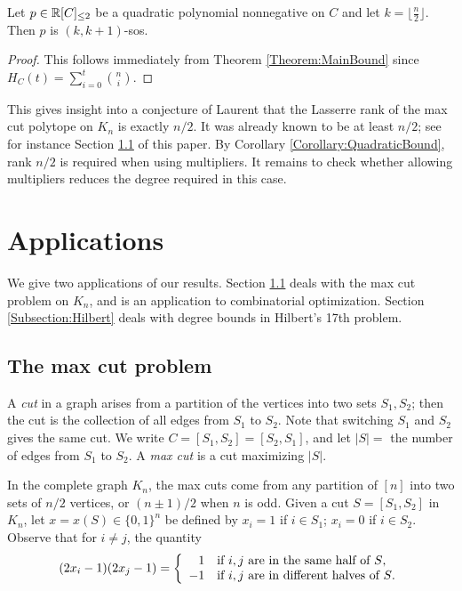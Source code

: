 \begin{corollary}\label{Corollary:QuadraticBound}
Let $p\in \mathbb{R}[C]_{\leq 2}$ be a quadratic polynomial nonnegative on $C$ and let $k=\lfloor \frac{n}{2}\rfloor$. Then $p$ is $(k,k+1)$-sos.
\end{corollary}
\begin{proof}
This follows immediately from Theorem \ref{Theorem:MainBound} since $H_C(t)=\sum_{i=0}^t \binom{n}{i}$.
\end{proof}
This gives insight into a conjecture of Laurent \cite{moniquestuff} that the Lasserre rank of the max cut polytope on $K_n$ is exactly $n/2$.
It was already known to be at least $n/2$; see for instance Section \ref{Subsection:MaxCut} of this paper. 
By Corollary \ref{Corollary:QuadraticBound}, rank $n/2$ is required when using multipliers.
It remains to check whether allowing multipliers reduces the degree required in this case.




\section{Applications}\label{Section:Applications}
We give two applications of our results. Section \ref{Subsection:MaxCut} deals with the max cut problem on $K_n$, and is an application to combinatorial optimization. Section \ref{Subsection:Hilbert} deals with degree bounds in Hilbert's 17th problem.

\subsection{The max cut problem}\label{Subsection:MaxCut}
A {\em cut} in a graph arises from a partition of the vertices into two sets $S_1,S_2$; then the cut is the collection of all edges from $S_1$ to $S_2$. Note that switching $S_1$ and $S_2$ gives the same cut. We write $C = [S_1,S_2] = [S_2,S_1]$, and let $|S| = $ the number of edges from $S_1$ to $S_2$. A {\em max cut} is a cut maximizing $|S|$.

 In the complete graph $K_n$, the max cuts come from any partition of $[n]$ into two sets of $n/2$ vertices, or $(n\pm 1)/2$ when $n$ is odd. Given a cut $S = [S_1,S_2]$ in $K_n$, let $x = x(S) \in \{0,1\}^n$ be defined by $x_i = 1$ if $i \in S_1$; $x_i = 0$ if $i \in S_2$. Observe that for $i \ne j$, the quantity 
$$(2x_i-1)(2x_j-1) = \left\{
\begin{array}{rl}
1 & \textup{if $i,j$ are in the same half of $S$,} \\
-1 & \textup{if $i,j$ are in different halves of $S$.}
\end{array}
\right.$$

